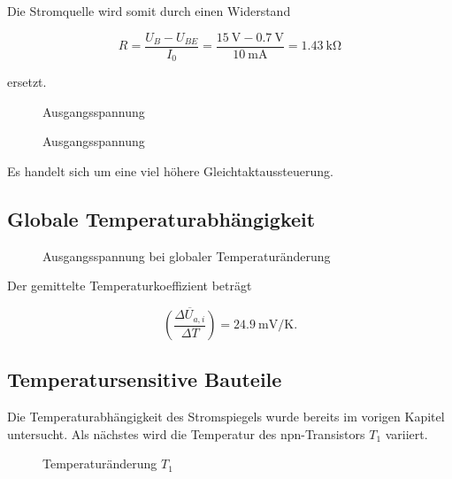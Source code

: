 Die Stromquelle wird somit durch einen Widerstand 

\begin{equation}
    R = \frac{U_B - U_{BE}}{I_0} = \frac{\SI{15}{\volt} - \SI{0,7}{\volt}}{\SI{10}{\milli\ampere}} = \SI{1,43}{\kilo\ohm}
\end{equation}

ersetzt.

\begin{figure}[H]
	\centering \small
	\scalebox{0.9}{}
	\caption{Ausgangsspannung}
	\label{fig_Kap5_18:transfer}
\end{figure}

\begin{figure}[H]
	\centering \small
	\scalebox{0.9}{}
	\caption{Ausgangsspannung}
	\label{fig_Kap5_19:transfer}
\end{figure}

Es handelt sich um eine viel höhere Gleichtaktaussteuerung.

\subsection{Globale Temperaturabhängigkeit}

\begin{figure}[H]
	\centering \small
	\scalebox{0.9}{}
	\caption{Ausgangsspannung bei globaler Temperaturänderung}
	\label{fig_Kap5_20:transfer}
\end{figure}

Der gemittelte Temperaturkoeffizient beträgt

\begin{equation}
    \overline{\left({\frac{\Delta U_{a,i}}{\Delta T}}\right)} = \SI{24,9}{\milli\volt\per\kelvin} .
\end{equation}

\subsection{Temperatursensitive Bauteile}
Die Temperaturabhängigkeit des Stromspiegels wurde bereits im vorigen Kapitel untersucht. Als nächstes wird die Temperatur des npn-Transistors $T_1$ variiert.

\begin{figure}[H]
	\centering \small
	\scalebox{0.9}{}
	\caption{Temperaturänderung $T_1$}
	\label{fig_Kap5_21:SR}
\end{figure}

